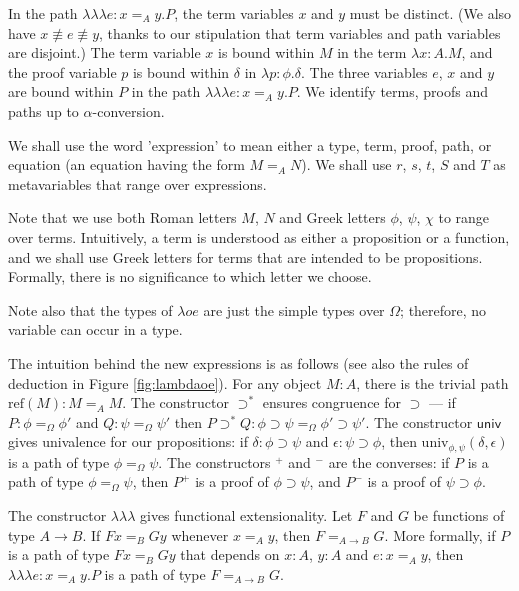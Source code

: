 \documentclass[a4paper,UKenglish]{lipics-v2016}
\newcommand*{\reff}[1]{\ensuremath{\mathrm{ref} \left( {#1} \right)}}
\newcommand*{\univ}[4]{\ensuremath{\mathrm{univ}_{{#1}, {#2}} \left({#3} , {#4} \right)}}
\newcommand*{\triplelambda}{\ensuremath{\lambda \!\! \lambda \!\! \lambda}}
\theoremstyle{definition}
\begin{document}
In the path $\triplelambda e : x =_A y . P$, the term variables $x$ and $y$ must be distinct.  (We also have $x \not\equiv e \not\equiv y$, thanks to our
stipulation that term variables and path variables are disjoint.)  The term variable $x$ is bound within $M$ in the term $\lambda x:A.M$,
and the proof variable $p$ is bound within $\delta$ in $\lambda p:\phi.\delta$.  The three variables $e$, $x$ and $y$ are bound within $P$ in the path
$\triplelambda e:x =_A y.P$.  We identify terms, proofs and paths up to $\alpha$-conversion.

We shall use the word 'expression' to mean either a type, term, proof, path, or equation (an equation having the form $M =_A N$).  We shall use $r$, $s$, $t$, $S$ and $T$ as metavariables that range over expressions.

Note that we use both Roman letters $M$, $N$ and Greek letters $\phi$, $\psi$, $\chi$ to range over terms.  Intuitively, a term is understood as either a proposition or a function,
and we shall use Greek letters for terms that are intended to be propositions.  Formally, there is no significance to which letter we choose.

Note also that the types of $\lambda o e$ are just the simple types over $\Omega$; therefore, no variable can occur in a type.

The intuition behind the new expressions is as follows (see also the rules of deduction in Figure \ref{fig:lambdaoe}).  For any object $M : A$, there is the trivial path $\reff{M} : M =_A M$.  The constructor $\supset^*$ ensures congruence for $\supset$ --- if $P : \phi =_\Omega \phi'$ and $Q : \psi =_\Omega \psi'$ then $P \supset^* Q : \phi \supset \psi =_\Omega \phi' \supset \psi'$.  The constructor $\mathsf{univ}$ gives univalence for our propositions: if $\delta : \phi \supset \psi$ and $\epsilon : \psi \supset \phi$, then $\univ{\phi}{\psi}{\delta}{\epsilon}$ is a path of type $\phi =_\Omega \psi$.  The constructors $^+$ and $^-$ are the converses: if $P$ is a path of type $\phi =_\Omega \psi$, then $P^+$ is a proof of $\phi \supset \psi$, and $P^-$ is a proof of $\psi \supset \phi$.

The constructor $\triplelambda$ gives functional extensionality.  Let $F$ and $G$ be functions of type $A \rightarrow B$.  If $F x =_B G y$ whenever $x =_A y$, then $F =_{A \rightarrow B} G$.  More formally, if $P$ is a path of type $Fx =_B Gy$ that depends on $x : A$, $y : A$ and $e : x =_A y$, then $\triplelambda e : x =_A y . P$ is a path of type $F =_{A \rightarrow B} G$.
\end{document}

